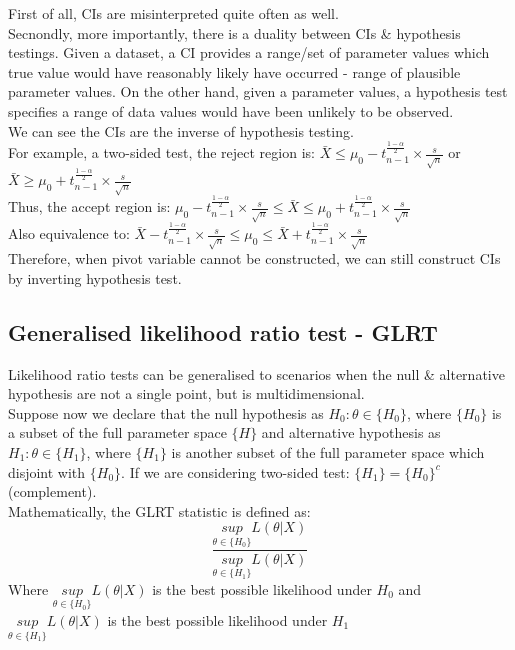 \documentclass[12pt ]{article}
\begin{document}
\noindent
First of all, CIs are misinterpreted quite often as well.\\
Secnondly, more importantly, there is a duality between CIs \& hypothesis testings. Given a dataset, a CI provides a range/set of parameter values which true value would have reasonably likely have occurred - range of plausible parameter values. On the other hand, given a parameter values, a hypothesis test specifies a range of data values would have been unlikely to be observed.\\
We can see the CIs are the inverse of hypothesis testing. \\

For example, a two-sided test, the reject region is: $\bar{X} \leq \mu_{0} - t^{\frac{1-\alpha}{2}}_{n-1} \times \frac{s}{\sqrt{n}}$ or $\bar{X} \geq \mu_{0} + t^{\frac{1-\alpha}{2}}_{n-1} \times \frac{s}{\sqrt{n}}$\\
Thus, the accept region is: $\mu_{0} - t^{\frac{1-\alpha}{2}}_{n-1} \times \frac{s}{\sqrt{n}} \leq \bar{X} \leq \mu_{0} + t^{\frac{1-\alpha}{2}}_{n-1} \times \frac{s}{\sqrt{n}}$ \\
Also equivalence to: $ \bar{X} - t^{\frac{1-\alpha}{2}}_{n-1} \times \frac{s}{\sqrt{n}} \leq  \mu_{0} \leq \bar{X} + t^{\frac{1-\alpha}{2}}_{n-1} \times \frac{s}{\sqrt{n}}$ \\

Therefore, when pivot variable cannot be constructed, we can still construct CIs by inverting hypothesis test.

\subsection{Generalised likelihood ratio test - GLRT}
Likelihood ratio tests can be generalised to scenarios when the null \& alternative hypothesis are not a single point, but is multidimensional.\\

Suppose now we declare that the null hypothesis as $H_{0}: \theta \in \{H_{0} \}$, where $ \{H_{0} \}$ is a subset of the full parameter space $\{H\}$ and alternative hypothesis as $H_{1}: \theta \in \{H_{1} \}$, where $\{H_{1} \}$ is another subset of the full parameter space which disjoint with $\{H_{0} \}$. If we are considering two-sided test: $\{H_{1} \} = \{H_{0} \}^c$ (complement).\\
Mathematically, the GLRT statistic is defined as:
\begin{equation*}
\frac{\underset{\theta \in \{H_{0}\}}{sup} L(\theta | X)}{\underset{\theta \in \{H_{1}\}}{sup} L(\theta | X)}
\end{equation*}
Where $\underset{\theta \in \{H_{0}\}}{sup} L(\theta | X)$ is the best possible likelihood under $H_{0}$ and $\underset{\theta \in \{H_{1}\}}{sup} L(\theta | X)$ is the best possible likelihood under $H_{1}$\\
\end{document}
